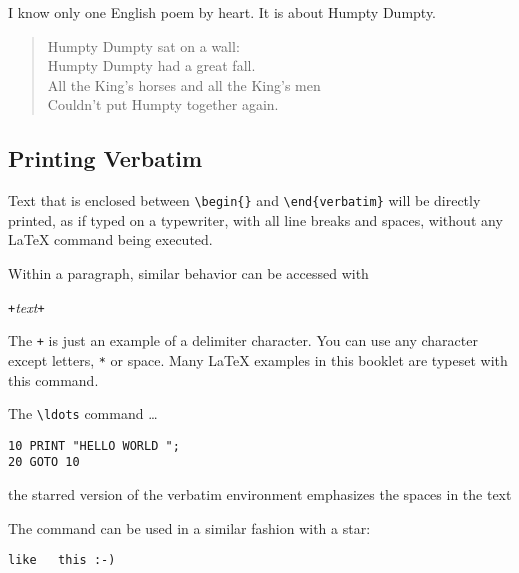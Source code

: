 \begin{example}
I know only one English poem by 
heart. It is about Humpty Dumpty.
\begin{flushleft}
\begin{verse}
Humpty Dumpty sat on a wall:\\
Humpty Dumpty had a great fall.\\ 
All the King's horses and all
the King's men\\
Couldn't put Humpty together
again.
\end{verse}
\end{flushleft}
\end{example}

\subsection{Printing Verbatim}

Text that is enclosed between \verb|\begin{|\verb|}| and
\verb|\end{verbatim}| will be directly printed, as if typed on a
typewriter, with all line breaks and spaces, without any \LaTeX{}
command being executed.

Within a paragraph, similar behavior can be accessed with
\begin{lscommand}
\verb|+|\emph{text}\verb|+|
\end{lscommand}
\noindent The \verb|+| is just an example of a delimiter character. You can use any
character except letters, \verb|*| or space. Many \LaTeX{} examples in this
booklet are typeset with this command.

\begin{example}
The \verb|\ldots| command \ldots

\begin{verbatim}
10 PRINT "HELLO WORLD ";
20 GOTO 10
\end{verbatim}
\end{example}

\begin{example}
\begin{verbatim*}
the starred version of
the      verbatim   
environment emphasizes
the spaces   in the text
\end{verbatim*}
\end{example}

The  command can be used in a similar fashion with a star:

\begin{example}
\verb*|like   this :-) |
\end{example}

